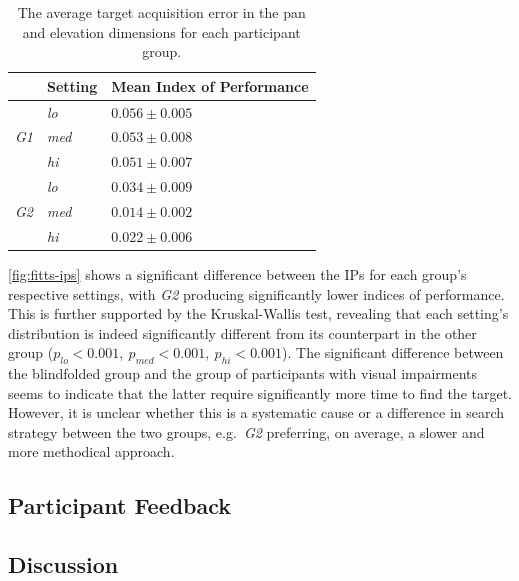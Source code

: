 \documentclass[acmsmall]{acmart}
\begin{document}
\begin{table}
  \centering
  \caption{The average target acquisition error in the pan and elevation dimensions for each participant group. }\label{tab:fitts-results}
  \begin{tabular}{p{0.5cm}p{1.5cm}p{2.5cm}}
    \toprule
    & Setting      & Mean Index of Performance \\ \midrule
    & \textit{lo}  & $0.056\pm0.005$ \\
    \textit{G1} & \textit{med} & $0.053\pm0.008$ \\
		& \textit{hi}  & $0.051\pm0.007$ \\ \cline{2-3}
    & \textit{lo}  & $0.034\pm0.009$ \\
    \textit{G2} & \textit{med} & $0.014\pm0.002$ \\
    & \textit{hi}  & $0.022\pm0.006$ \\
    \bottomrule
  \end{tabular}
\end{table}

\cref{fig:fitts-ips} shows a significant difference between the IPs for each group's respective settings, with \textit{G2} producing significantly lower indices of performance.
This is further supported by the Kruskal-Wallis test, revealing that each setting's distribution is indeed significantly different from its counterpart in the other group ($p_{lo} < 0.001,~p_{med} < 0.001,~p_{hi} < 0.001$).
The significant difference between the blindfolded group and the group of participants with visual impairments seems to indicate that the latter require significantly more time to find the target. 
However, it is unclear whether this is a systematic cause or a difference in search strategy between the two groups, e.g.\ \textit{G2} preferring, on average, a slower and more methodical approach.

\subsection{Participant Feedback}


\subsection{Discussion}
\end{document}
